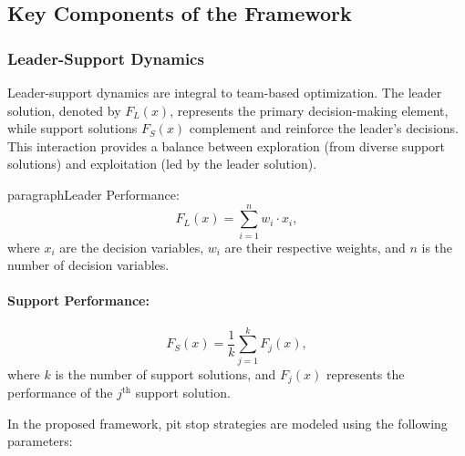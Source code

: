 \documentclass[preprint,12pt]{elsarticle}
\begin{document}
\subsection{Key Components of the Framework}

\subsubsection{Leader-Support Dynamics}

Leader-support dynamics are integral to team-based optimization. The leader solution, denoted by \( F_L(x) \), represents the primary decision-making element, while support solutions \( F_S(x) \) complement and reinforce the leader’s decisions. This interaction provides a balance between exploration (from diverse support solutions) and exploitation (led by the leader solution).

paragraph{Leader Performance:}
\begin{equation}
F_L(x) = \sum_{i=1}^{n} w_i \cdot x_i,
\label{eq:leader}
\end{equation}
where \( x_i \) are the decision variables, \( w_i \) are their respective weights, and \( n \) is the number of decision variables.


\paragraph{Support Performance:}
\begin{equation}
F_S(x) = \frac{1}{k} \sum_{j=1}^{k} F_j(x),
\label{eq:support}
\end{equation}
where \( k \) is the number of support solutions, and \( F_j(x) \) represents the performance of the \( j^\text{th} \) support solution.


In the proposed framework, pit stop strategies are modeled using the following parameters:
\end{document}

